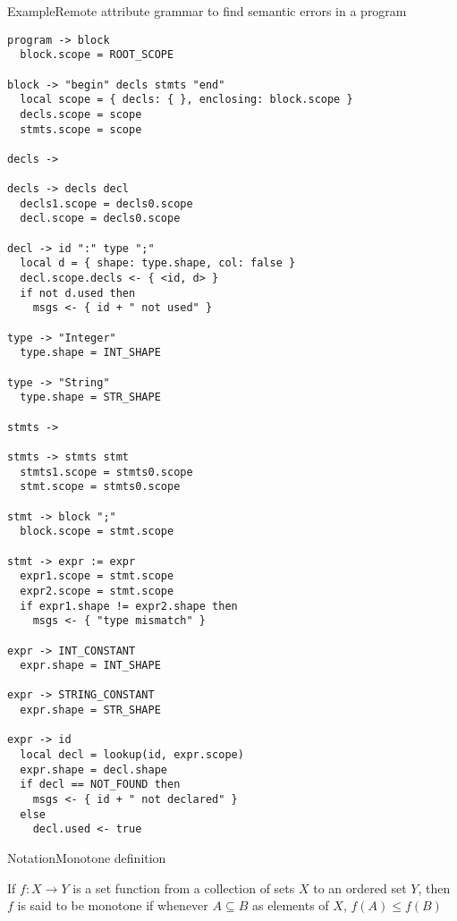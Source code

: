 \begin{frame}[fragile=singleslide]{Example}{Remote attribute grammar to find semantic errors in a program}

\begin{centering}
\begin{multicols}{2}
\begin{Verbatim}[fontsize=\fontsize{5.5}{6}\selectfont]
program -> block
  block.scope = ROOT_SCOPE

block -> "begin" decls stmts "end"
  local scope = { decls: { }, enclosing: block.scope }
  decls.scope = scope
  stmts.scope = scope

decls ->

decls -> decls decl
  decls1.scope = decls0.scope
  decl.scope = decls0.scope

decl -> id ":" type ";"
  local d = { shape: type.shape, col: false } 
  decl.scope.decls <- { <id, d> }
  if not d.used then
    msgs <- { id + " not used" }

type -> "Integer"
  type.shape = INT_SHAPE

type -> "String"
  type.shape = STR_SHAPE

stmts -> 

stmts -> stmts stmt
  stmts1.scope = stmts0.scope
  stmt.scope = stmts0.scope

stmt -> block ";"
  block.scope = stmt.scope

stmt -> expr := expr
  expr1.scope = stmt.scope
  expr2.scope = stmt.scope
  if expr1.shape != expr2.shape then
    msgs <- { "type mismatch" }

expr -> INT_CONSTANT
  expr.shape = INT_SHAPE

expr -> STRING_CONSTANT
  expr.shape = STR_SHAPE

expr -> id
  local decl = lookup(id, expr.scope)
  expr.shape = decl.shape
  if decl == NOT_FOUND then
    msgs <- { id + " not declared" }
  else
    decl.used <- true
\end{Verbatim}
\end{multicols}
\end{centering}

\end{frame}





\begin{frame}{Notation}{Monotone definition}

\begin{definition}
If $f:X \rightarrow Y$ is a \alert{set function} from a collection of sets $X$ to an ordered set $Y$, then $f$ is said to be monotone if whenever \alert{$A \subseteq B$} as elements of $X$, \alert{$f(A) \leq f(B)$}
\end{definition}

\end{frame}


